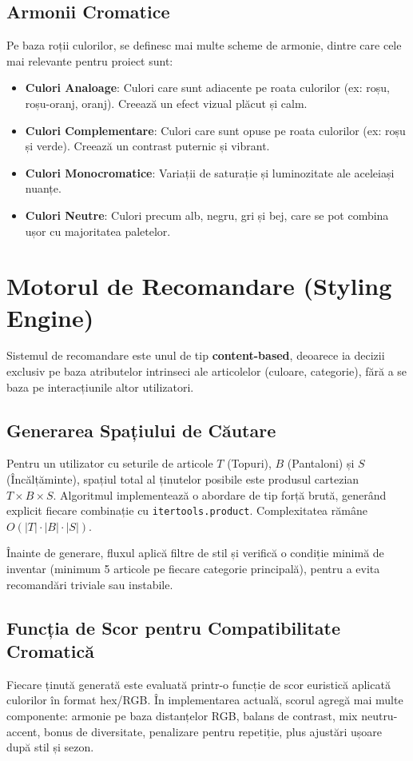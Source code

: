 \subsection{Armonii Cromatice}
Pe baza roții culorilor, se definesc mai multe scheme de armonie, dintre care cele mai relevante pentru proiect sunt:
\begin{itemize}
    \item \textbf{Culori Analoage}: Culori care sunt adiacente pe roata culorilor (ex: roșu, roșu-oranj, oranj). Creează un efect vizual plăcut și calm.
    \item \textbf{Culori Complementare}: Culori care sunt opuse pe roata culorilor (ex: roșu și verde). Creează un contrast puternic și vibrant.
    \item \textbf{Culori Monocromatice}: Variații de saturație și luminozitate ale aceleiași nuanțe.
    \item \textbf{Culori Neutre}: Culori precum alb, negru, gri și bej, care se pot combina ușor cu majoritatea paletelor.
\end{itemize}

\section{Motorul de Recomandare (Styling Engine)}
\label{sec:recomandare_cap4}

Sistemul de recomandare este unul de tip \textbf{content-based}, deoarece ia decizii exclusiv pe baza atributelor intrinseci ale articolelor (culoare, categorie), fără a se baza pe interacțiunile altor utilizatori.

\subsection{Generarea Spațiului de Căutare}
Pentru un utilizator cu seturile de articole $T$ (Topuri), $B$ (Pantaloni) și $S$ (Încălțăminte), spațiul total al ținutelor posibile este produsul cartezian $T \times B \times S$. Algoritmul implementează o abordare de tip forță brută, generând explicit fiecare combinație cu \texttt{itertools.product}. Complexitatea rămâne $O(|T| \cdot |B| \cdot |S|)$.

Înainte de generare, fluxul aplică filtre de stil și verifică o condiție minimă de inventar (minimum 5 articole pe fiecare categorie principală), pentru a evita recomandări triviale sau instabile.

\subsection{Funcția de Scor pentru Compatibilitate Cromatică}
Fiecare ținută generată este evaluată printr-o funcție de scor euristică aplicată culorilor în format hex/RGB. În implementarea actuală, scorul agregă mai multe componente: armonie pe baza distanțelor RGB, balans de contrast, mix neutru-accent, bonus de diversitate, penalizare pentru repetiție, plus ajustări ușoare după stil și sezon.

